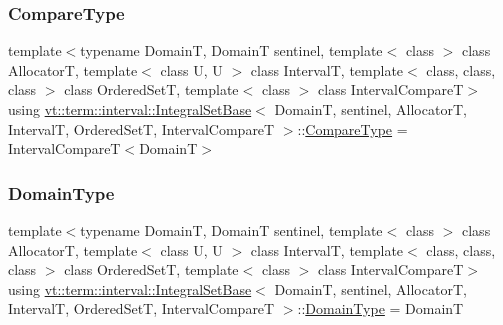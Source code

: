 \mbox{\label{structvt_1_1term_1_1interval_1_1_integral_set_base_a8788c1d68e2b4348c341c120363c95e7}} 
\subsubsection{\texorpdfstring{Compare\+Type}{CompareType}}
{\footnotesize\ttfamily template$<$typename DomainT, DomainT sentinel, template$<$ class $>$ class AllocatorT, template$<$ class U, U $>$ class IntervalT, template$<$ class, class, class $>$ class Ordered\+SetT, template$<$ class $>$ class Interval\+CompareT$>$ \\
using \hyperlink{structvt_1_1term_1_1interval_1_1_integral_set_base}{vt\+::term\+::interval\+::\+Integral\+Set\+Base}$<$ DomainT, sentinel, AllocatorT, IntervalT, Ordered\+SetT, Interval\+CompareT $>$\+::\hyperlink{structvt_1_1term_1_1interval_1_1_integral_set_base_a8788c1d68e2b4348c341c120363c95e7}{Compare\+Type} =  Interval\+CompareT$<$DomainT$>$}

\mbox{\label{structvt_1_1term_1_1interval_1_1_integral_set_base_a74b3ffb0498e75459e23d59b2d4facfa}} 
\subsubsection{\texorpdfstring{Domain\+Type}{DomainType}}
{\footnotesize\ttfamily template$<$typename DomainT, DomainT sentinel, template$<$ class $>$ class AllocatorT, template$<$ class U, U $>$ class IntervalT, template$<$ class, class, class $>$ class Ordered\+SetT, template$<$ class $>$ class Interval\+CompareT$>$ \\
using \hyperlink{structvt_1_1term_1_1interval_1_1_integral_set_base}{vt\+::term\+::interval\+::\+Integral\+Set\+Base}$<$ DomainT, sentinel, AllocatorT, IntervalT, Ordered\+SetT, Interval\+CompareT $>$\+::\hyperlink{structvt_1_1term_1_1interval_1_1_integral_set_base_a74b3ffb0498e75459e23d59b2d4facfa}{Domain\+Type} =  DomainT}

